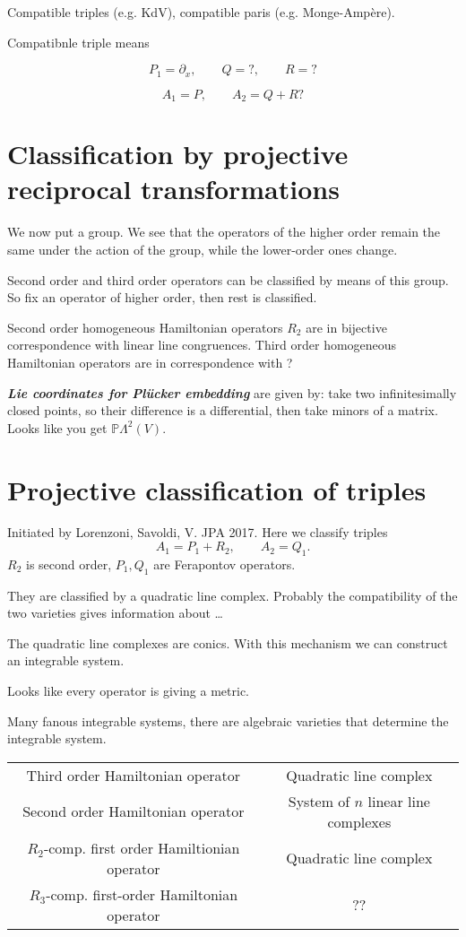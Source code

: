 Compatible triples (e.g. KdV), compatible paris (e.g. Monge-Ampère).

Compatibnle triple means

\[P_1=\partial_x,\qquad Q=?,\qquad   R=?\]

 \[A_1=P,\qquad  A_2=Q+R?\]


\section{Classification by projective reciprocal transformations}
 
We now put a group. We see that the operators of the higher order remain the same under the action of the group, while the lower-order ones change.

Second order and third order operators can be classified by means of this group. So fix an operator of higher order, then rest is classified.

Second order homogeneous Hamiltonian operators $R_2$ are in bijective correspondence with linear line congruences. Third order homogeneous Hamiltonian operators are in correspondence with ?

\textit{\textbf{Lie coordinates for Plücker embedding}} are given by: take two infinitesimally closed points, so their difference is a differential, then take minors of a matrix. Looks like you get  $\mathbb{P}\Lambda^{2}(V)$.

\section{Projective classification of triples}

Initiated by Lorenzoni, Savoldi, V. JPA 2017. Here we classify triples
\[A_1=P_1+R_2,\qquad  A_2=Q_1.\]
$R_2$ is second order, $P_1,Q_1$ are Ferapontov operators.

They are classified by a quadratic line complex. Probably the compatibility of the two varieties gives information about …

\begin{example}\leavevmode
	The quadratic line complexes are conics. With this mechanism we can construct an integrable system.

	\begin{remark}[Dani]\leavevmode
		Looks like every operator is giving a metric.
	\end{remark}
\end{example}

Many fanous integrable systems, there are algebraic varieties that determine the integrable system.

	\begin{tabular}{c | c}
		Third order Hamiltonian operator& Quadratic line complex\\
Second order Hamiltonian operator & System of $n$ linear line complexes\\
$R_2$-comp. first order Hamiltionian operator& Quadratic line complex\\
$R_3$-comp. first-order Hamiltonian operator & ??
	\end{tabular}







